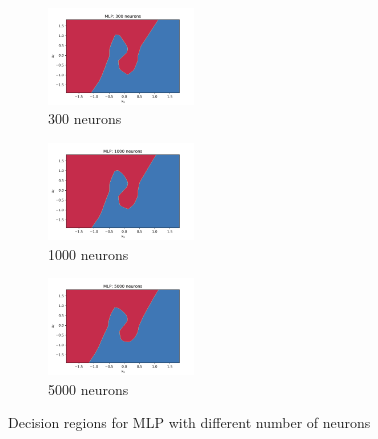 \documentclass[a4paper]{article}    %
\begin{document}
\begin{figure}[H]
    \hfill
    \begin{subfigure}{0.32\textwidth}
        \centering
        \includegraphics[width=3.85cm]{decision_regions_300}
        \caption{300 neurons}
        \label{fig:mlp-300_neurons}
    \end{subfigure}
    \hfill
    \begin{subfigure}{0.32\textwidth}
        \centering
        \includegraphics[width=3.85cm]{decision_regions_1000}
        \caption{1000 neurons}
        \label{fig:mlp-1000_neurons}
    \end{subfigure}
    \hfill
    \begin{subfigure}{0.32\textwidth}
        \centering
        \includegraphics[width=3.85cm]{decision_regions_5000}
        \caption{5000 neurons}
        \label{fig:mlp-5000_neurons}
    \end{subfigure}
    \hfill
    \caption{Decision regions for MLP with different number of neurons}
    \label{fig:mlp-decision_regions_N_neurons}
\end{figure}
\end{document}
